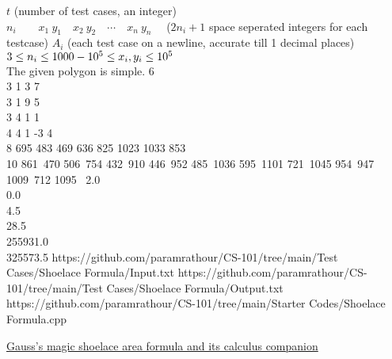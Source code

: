 \begin{testcasesMore}
	{$t$ \hfill(number of test cases, an integer)\\
	$n_i\qquad x_1\ y_1\quad x_2\ y_2\quad \cdots\quad  x_n\ y_n\quad$ \hfill($2n_i+1$ space seperated integers for each testcase)}
	{$A_{i}$ \hfill(each test case on a newline, accurate till 1 decimal places)}
	{$3 \leq n_i \leq 1000\\ -10^5 \leq x_i, y_i \leq 10^5$\\
	The given polygon is simple.}
	{6\\3 1 3 7\\3 1 9 5\\3 4 1 1\\4 4 1 -3 4\\8 695 483 469 636 825 1023 1033 853\quad\\10 861\ 470 506\ 754 432\ 910 446\ 952 485\ 1036  595\ 1101 721\ 1045 954\ 947 1009\ 712 1095\ }
	{2.0\\0.0\\4.5\\28.5\\255931.0\\325573.5}
	{https://github.com/paramrathour/CS-101/tree/main/Test Cases/Shoelace Formula/Input.txt}
	{https://github.com/paramrathour/CS-101/tree/main/Test Cases/Shoelace Formula/Output.txt}
	{https://github.com/paramrathour/CS-101/tree/main/Starter Codes/Shoelace Formula.cpp}
\end{testcasesMore}
\begin{funvideo}
\href{https://youtu.be/0KjG8Pg6LGk}{Gauss's magic shoelace area formula and its calculus companion}
\end{funvideo}